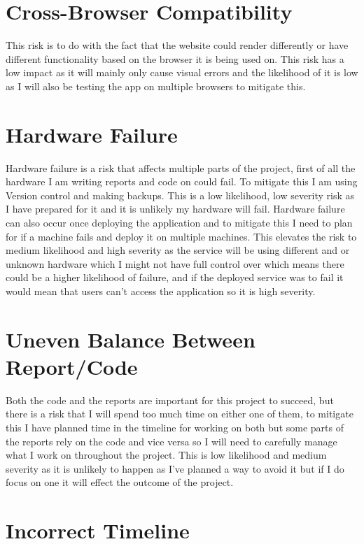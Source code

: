 \documentclass[]{project_report}
\begin{document}
\section{Cross-Browser Compatibility}

This risk is to do with the fact that the website could render differently or have different functionality based on the browser it is being used on. This risk has a low impact as it will mainly only cause visual errors and the likelihood of it is low as I will also be testing the app on multiple browsers to mitigate this. 

\section{Hardware Failure}

Hardware failure is a risk that affects multiple parts of the project, first of all the hardware I am writing reports and code on could fail. To mitigate this I am using Version control and making backups. This is a low likelihood, low severity risk as I have prepared for it and it is unlikely my hardware will fail. Hardware failure can also occur once deploying the application and to mitigate this I need to plan for if a machine fails and deploy it on multiple machines. This elevates the risk to medium likelihood and high severity as the service will be using different and or unknown hardware which I might not have full control over which means there could be a higher likelihood of failure, and if the deployed service was to fail it would mean that users can't access the application so it is high severity.

\section{Uneven Balance Between Report/Code}

Both the code and the reports are important for this project to succeed, but there is a risk that I will spend too much time on either one of them, to mitigate this I have planned time in the timeline for working on both but some parts of the reports rely on the code and vice versa so I will need to carefully manage what I work on throughout the project. This is low likelihood and medium severity as it is unlikely to happen as I've planned a way to avoid it but if I do focus on one it will effect the outcome of the project. 

\section{Incorrect Timeline}
\end{document}
